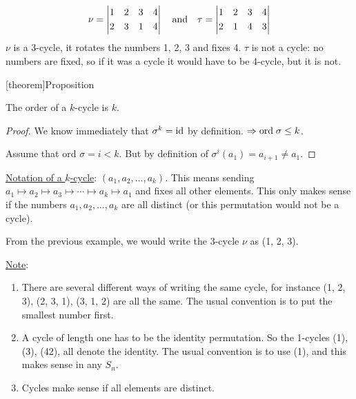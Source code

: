 \documentclass[12pt]{report}
\theoremstyle{definition}
\begin{document}
\begin{ex}
    \[
        \nu = \left|
        \begin{align*}
            & 1 && 2 && 3 && 4 \\
            & 2 && 3 && 1 && 4
        \end{align*}
        \right|
        \quad \textnormal{and} \quad
        \tau= \left|
        \begin{align*}
            & 1 && 2 && 3 && 4 \\
            & 2 && 1 && 4 && 3
        \end{align*}
        \right| 
    \]
    $\nu$ is a 3-cycle, it rotates the numbers 1, 2, 3 and fixes 4.
    $\tau$ is not a cycle: no numbers are fixed, so if it was a cycle
    it would have to be 4-cycle, but it is not.
\end{ex}

[theorem]{Proposition}
\begin{order of k-cycle}
    The order of a $k$-cycle is $k$.
\end{order of k-cycle}

\begin{proof}
    We know immediately that $\sigma^{k} = \textnormal{id}$ by definition.
    $\Rightarrow \textnormal{ord}\; \sigma \le k$.
    
    Assume that ord $\sigma = i < k$. But by definition of $\sigma^{i}(a_1) = a_{i + 1} \neq a_1$.
\end{proof}

\underline{Notation of a $k$-cycle}: $(a_1, a_2, \ldots, a_k)$.
This means sending $a_1 \mapsto a_2 \mapsto a_3 \mapsto \cdots \mapsto a_k \mapsto a_1$
and fixes all other elements. This only makes sense if the numbers 
$a_1, a_2, \ldots, a_k$ are all distinct (or this permutation would not be a cycle).

\begin{ex}
    From the previous example, we would write the 3-cycle $\nu$ as (1, 2, 3).
\end{ex}

\noindent\underline{Note}:
\begin{enumerate}[label = (\arabic*)]
    \item There are several different ways of writing the same cycle, for instance
        (1, 2, 3), (2, 3, 1), (3, 1, 2) are all the same. The usual convention is to
        put the smallest number first.

    \item A cycle of length one has to be the identity permutation.
        So the 1-cycles (1), (3), (42), all denote the identity. 
        The usual convention is to use (1), and this makes sense in any $S_n$.

    \item Cycles make sense if all elements are distinct.
\end{enumerate}
\end{document}
